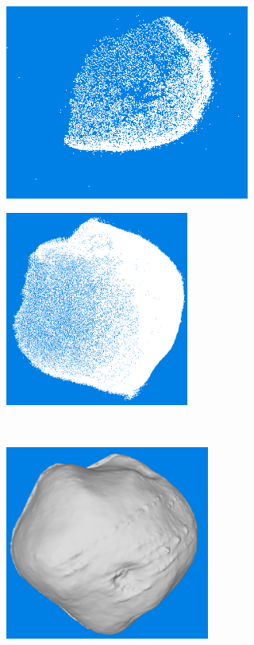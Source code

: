 \begin{figure}[htb]
    \centering
    \begin{subfigure}[b]{0.46\textwidth}
        \centering
        \includegraphics[width=\textwidth,height=6.4cm]{doc/thesis/0_figures/models_quality/100_1/120_100_1_points2.png}
        \caption{}
        \label{fig:recon_step_point}
    \end{subfigure}
    \begin{subfigure}[b]{0.46\textwidth}
        \centering
        \includegraphics[width=\textwidth,height=6.4cm]{doc/thesis/0_figures/models_quality/100_1/120_100_1_dense1.png}
        \caption{}
        \label{fig:recon_step_dense}
    \end{subfigure}
    \\
    \begin{subfigure}[b]{0.46\textwidth}
        \centering
        \includegraphics[width=\textwidth,height=6.4cm]{doc/thesis/0_figures/models_quality/100_1/120_100_1_mesh1.png}

\end{subfigure}
\end{figure}
